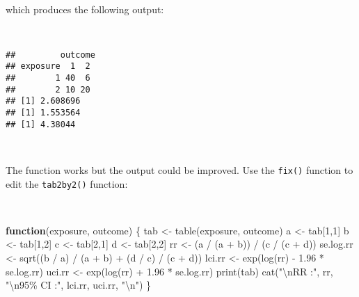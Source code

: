 \documentclass[
  12pt,
  a4paper]{book}
\newenvironment{Shaded}{\begin{snugshade}}{\end{snugshade}}
\newcommand{\ControlFlowTok}[1]{\textcolor[rgb]{0.13,0.29,0.53}{\textbf{#1}}}
\newcommand{\DecValTok}[1]{\textcolor[rgb]{0.00,0.00,0.81}{#1}}
\newcommand{\FloatTok}[1]{\textcolor[rgb]{0.00,0.00,0.81}{#1}}
\newcommand{\FunctionTok}[1]{\textcolor[rgb]{0.00,0.00,0.00}{#1}}
\newcommand{\NormalTok}[1]{#1}
\newcommand{\OtherTok}[1]{\textcolor[rgb]{0.56,0.35,0.01}{#1}}
\newcommand{\SpecialCharTok}[1]{\textcolor[rgb]{0.00,0.00,0.00}{#1}}
\newcommand{\StringTok}[1]{\textcolor[rgb]{0.31,0.60,0.02}{#1}}
\begin{document}
~

which produces the following output:

~

\begin{verbatim}
##         outcome
## exposure  1  2
##        1 40  6
##        2 10 20
## [1] 2.608696
## [1] 1.553564
## [1] 4.38044
\end{verbatim}

~

The function works but the output could be improved. Use the \texttt{fix()} function to edit the \texttt{tab2by2()} function:

~

\begin{Shaded}
\begin{Highlighting}[]
\ControlFlowTok{function}\NormalTok{(exposure, outcome) \{}
\NormalTok{  tab }\OtherTok{\textless{}{-}} \FunctionTok{table}\NormalTok{(exposure, outcome)}
\NormalTok{  a }\OtherTok{\textless{}{-}}\NormalTok{ tab[}\DecValTok{1}\NormalTok{,}\DecValTok{1}\NormalTok{]}
\NormalTok{  b }\OtherTok{\textless{}{-}}\NormalTok{ tab[}\DecValTok{1}\NormalTok{,}\DecValTok{2}\NormalTok{]}
\NormalTok{  c }\OtherTok{\textless{}{-}}\NormalTok{ tab[}\DecValTok{2}\NormalTok{,}\DecValTok{1}\NormalTok{]}
\NormalTok{  d }\OtherTok{\textless{}{-}}\NormalTok{ tab[}\DecValTok{2}\NormalTok{,}\DecValTok{2}\NormalTok{]}
\NormalTok{  rr }\OtherTok{\textless{}{-}}\NormalTok{ (a }\SpecialCharTok{/}\NormalTok{ (a }\SpecialCharTok{+}\NormalTok{ b)) }\SpecialCharTok{/}\NormalTok{ (c }\SpecialCharTok{/}\NormalTok{ (c }\SpecialCharTok{+}\NormalTok{ d))}
\NormalTok{  se.log.rr }\OtherTok{\textless{}{-}} \FunctionTok{sqrt}\NormalTok{((b }\SpecialCharTok{/}\NormalTok{ a) }\SpecialCharTok{/}\NormalTok{ (a }\SpecialCharTok{+}\NormalTok{ b) }\SpecialCharTok{+}\NormalTok{ (d }\SpecialCharTok{/}\NormalTok{ c) }\SpecialCharTok{/}\NormalTok{ (c }\SpecialCharTok{+}\NormalTok{ d)) }
\NormalTok{  lci.rr }\OtherTok{\textless{}{-}} \FunctionTok{exp}\NormalTok{(}\FunctionTok{log}\NormalTok{(rr) }\SpecialCharTok{{-}} \FloatTok{1.96} \SpecialCharTok{*}\NormalTok{ se.log.rr)}
\NormalTok{  uci.rr }\OtherTok{\textless{}{-}} \FunctionTok{exp}\NormalTok{(}\FunctionTok{log}\NormalTok{(rr) }\SpecialCharTok{+} \FloatTok{1.96} \SpecialCharTok{*}\NormalTok{ se.log.rr)}
  \FunctionTok{print}\NormalTok{(tab)}
  \FunctionTok{cat}\NormalTok{(}\StringTok{"}\SpecialCharTok{\textbackslash{}n}\StringTok{RR :"}\NormalTok{, rr,}
      \StringTok{"}\SpecialCharTok{\textbackslash{}n}\StringTok{95\% CI :"}\NormalTok{, lci.rr, uci.rr, }\StringTok{"}\SpecialCharTok{\textbackslash{}n}\StringTok{"}\NormalTok{)}
\NormalTok{\}}
\end{Highlighting}
\end{Shaded}
\end{document}
